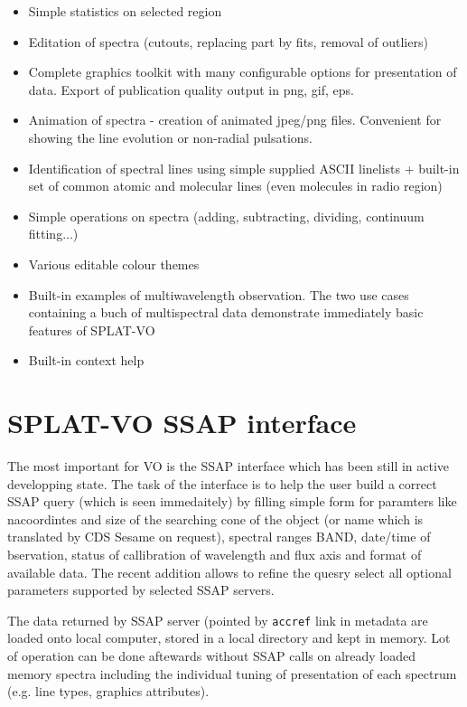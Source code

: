 \documentclass[final,authoryear,5p,times,twocolumn]{elsarticle}
\begin{document}
\begin{itemize}
\item Simple statistics on selected region

\item Editation of spectra (cutouts, replacing part by fits, removal of outliers)

\item Complete graphics toolkit with many configurable options for
presentation of data. Export of publication quality output in png, gif, eps.

\item Animation of spectra - creation of animated jpeg/png files. Convenient
for showing the line evolution or non-radial pulsations.

\item Identification of spectral lines using simple supplied ASCII linelists +
built-in set of common  atomic and molecular lines (even molecules in radio
region)

\item Simple operations on spectra (adding, subtracting, dividing, continuum fitting...)

\item Various editable colour themes

\item Built-in examples of multiwavelength observation. The two use cases
containing a buch of multispectral data demonstrate immediately basic features
of SPLAT-VO

\item Built-in context help


\end{itemize}


\section{ SPLAT-VO SSAP interface}

The most important for VO is the SSAP interface which has been still in active
developping state.  The task of the interface is to help the user build a
correct SSAP query (which is seen immedaitely) by filling simple form for
paramters like nacoordintes and size of the searching cone of the object (or
name which is translated by CDS Sesame on request), spectral ranges BAND,
date/time of bservation, status of callibration of  wavelength and flux axis
and format of available data.  The recent addition allows to refine the quesry
select all optional parameters supported by selected SSAP servers.

The data returned by SSAP server (pointed by {\tt accref} link in metadata are
loaded onto local computer, stored in a local directory  and kept in memory.
Lot of operation can be done aftewards without SSAP calls on already loaded
memory spectra including the individual tuning of presentation of each
spectrum (e.g. line types, graphics attributes).
\end{document}
